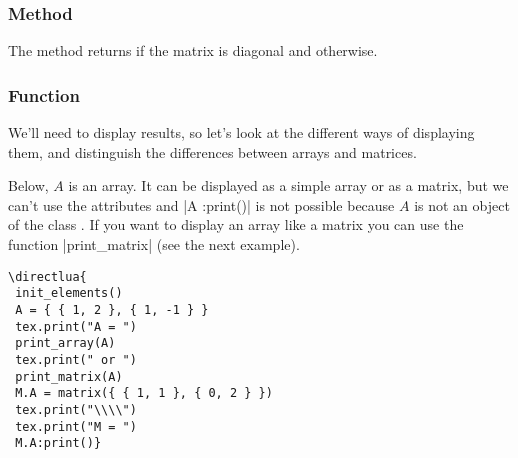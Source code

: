 
\subsubsection{Method } %
\label{ssub:method_is_diagonal}

The method returns  if the matrix is diagonal and  otherwise.




\subsubsection{Function } %
\label{ssub:display_a_table_or_array_function_code_print_array}

We'll need to display results, so let's look at the different ways of displaying them, and distinguish the differences between arrays and matrices.

Below, $A$ is an array. It can be displayed as a simple array or as a matrix, but we can't use the attributes and |A :print()| is not possible because $A$ is not an object of the class . If you want to display an array like a matrix you can use the function |print_matrix| (see  the next example).

\vspace{.5em}
\begin{minipage}{.5\textwidth}
\begin{verbatim}
\directlua{
 init_elements()
 A = { { 1, 2 }, { 1, -1 } }
 tex.print("A = ")
 print_array(A)
 tex.print(" or ")
 print_matrix(A)
 M.A = matrix({ { 1, 1 }, { 0, 2 } })
 tex.print("\\\\")
 tex.print("M = ")
 M.A:print()}
\end{verbatim}
\end{minipage}
 \begin{minipage}{.5\textwidth}
 \end{minipage}


